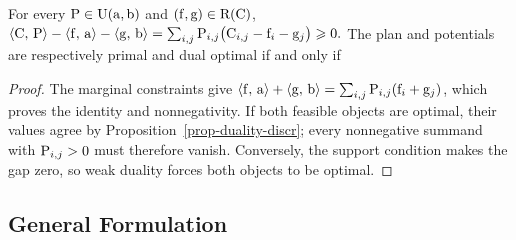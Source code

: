 \begin{prop}\label{prop-discrete-complementary-slackness}
For every $\P\in\CouplingsD(\a,\b)$ and $(\fD,\gD)\in\PotentialsD(\C)$, \(\dotp{\C}{\P}-\dotp{\fD}{\a}-\dotp{\gD}{\b} = \sum_{i,j}\P_{i,j}\bigl(\C_{i,j}-\fD_i-\gD_j\bigr) \geq0.\)
The plan and potentials are respectively primal and dual optimal if and only if
\end{prop}
\begin{proof}
The marginal constraints give
$\dotp{\fD}{\a}+\dotp{\gD}{\b}
=\sum_{i,j}\P_{i,j}(\fD_i+\gD_j)$, which proves the identity and nonnegativity. If both feasible objects are optimal, their values agree by Proposition~\ref{prop-duality-discr}; every nonnegative summand with $\P_{i,j}>0$ must therefore vanish. Conversely, the support condition makes the gap zero, so weak duality forces both objects to be optimal.
\end{proof}
\subsection{General Formulation}
\label{sec-dual-general}
